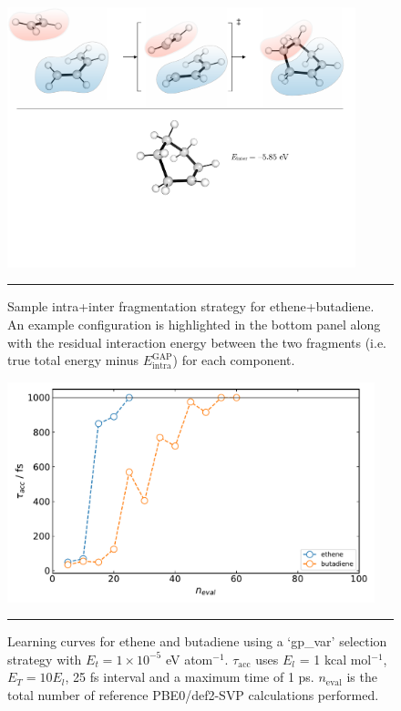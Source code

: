 \documentclass[11pt]{article}
\numberwithin{equation}{subsection}
\newcommand{\kcal}{kcal mol$^{-1}$}
\begin{document}
\begin{figure}[h!]
	\centering
	\vspace{0.4cm}
	\includegraphics[width=0.9\textwidth]{figSX17.pdf}
	\vspace{0.1cm}
	\hrule
	\vspace{0.1cm}
	\caption{Sample intra+inter fragmentation strategy for ethene+butadiene. An example configuration is highlighted in the bottom panel along with the residual interaction energy between the two fragments (i.e. true total energy minus $E_\text{intra}^\text{GAP}$) for each component.}
	\label{fig::SX17}
\end{figure}


\begin{figure}[h!]
	\centering
	\vspace{0.4cm}
	\includegraphics[height=6.4cm]{figSX16.pdf}
	\vspace{0.1cm}
	\hrule
	\vspace{0.1cm}
	\caption{Learning curves for ethene and butadiene using a `gp\_var' selection strategy with $E_t = 1\times10^{-5}$ eV atom${}^{-1}$. $\tau_\text{acc}$ uses $E_l$ = 1 \kcal, $E_T = 10E_l$, 25 fs interval and a maximum time of 1 ps. $n_\text{eval}$ is the total number of reference PBE0/def2-SVP calculations performed.}
	\label{fig::SX16}
\end{figure}
\end{document}
